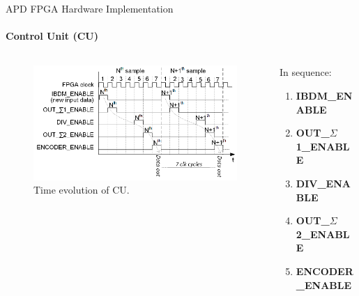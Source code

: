 \documentclass{beamer}
\begin{document}
\begin{frame}{APD FPGA Hardware Implementation}
    \framesubtitle{Control Unit (CU)}
    \begin{columns}
        \begin{column}{0.55\textwidth}
            \begin{figure}
                \includegraphics[width=\textwidth]{Images_Rocco/CU_time_evolution.png}
                \caption{Time evolution of CU.}
                \label{fig:AR_CU_time_evolution}
            \end{figure}
        \end{column}
        \hspace{-0.8cm}
        \begin{column}{0.45\textwidth}
            In sequence:
            \begin{enumerate}
            	\item \alert{\bf IBDM\_ENABLE}%
                \item \alert{\bf OUT\_$\Sigma$1\_ENABLE}
                \item \alert{\bf DIV\_ENABLE}
                \item \alert{\bf OUT\_$\Sigma$2\_ENABLE}%
                \item \alert{\bf ENCODER\_ENABLE}%
            \end{enumerate}
        \end{column}
    \end{columns}
\end{frame}
\end{document}
